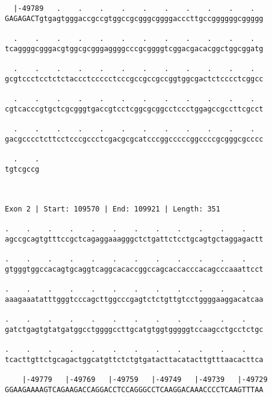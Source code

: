 \documentclass{article}
\begin{document}
\begin{Verbatim}
  |-49789   .    .    .    .    .    .    .    .    .    .  
GAGAGACTgtgagtgggaccgccgtggccgcgggcggggacccttgccggggggcggggg
                                                            
  .    .    .    .    .    .    .    .    .    .    .    .  
tcaggggcgggacgtggcgcgggaggggcccgcggggtcggacgacacggctggcggatg
                                                            
  .    .    .    .    .    .    .    .    .    .    .    .  
gcgtccctcctctctaccctccccctcccgccgccgccggtggcgactctcccctcggcc
                                                            
  .    .    .    .    .    .    .    .    .    .    .    .  
cgtcacccgtgctcgcgggtgaccgtcctcggcgcggcctccctggagccgccttcgcct
                                                            
  .    .    .    .    .    .    .    .    .    .    .    .  
gacgcccctcttcctcccgccctcgacgcgcatcccggcccccggccccgcgggcgcccc
                                                            
  .    .
tgtcgccg
        
        
 
Exon 2 | Start: 109570 | End: 109921 | Length: 351
 
.    .    .    .    .    .    .    .    .    .    .    .    
agccgcagtgtttccgctcagaggaaagggctctgattctcctgcagtgctaggagactt
                                                            
.    .    .    .    .    .    .    .    .    .    .    .    
gtgggtggccacagtgcaggtcaggcacaccggccagcaccacccacagcccaaattcct
                                                            
.    .    .    .    .    .    .    .    .    .    .    .    
aaagaaatatttgggtcccagcttggcccgagtctctgttgtcctggggaaggacatcaa
                                                            
.    .    .    .    .    .    .    .    .    .    .    .    
gatctgagtgtatgatggcctggggccttgcatgtggtgggggtccaagcctgcctctgc
                                                            
.    .    .    .    .    .    .    .    .    .    .    .    
tcacttgttctgcagactggcatgttctctgtgatacttacatacttgtttaacacttca
                                                            
    |-49779   |-49769   |-49759   |-49749   |-49739   |-49729
GGAAGAAAAGTCAGAAGACCAGGACCTCCAGGGCCTCAAGGACAAACCCCTCAAGTTTAA
                                                            

\end{Verbatim}
\end{document}
